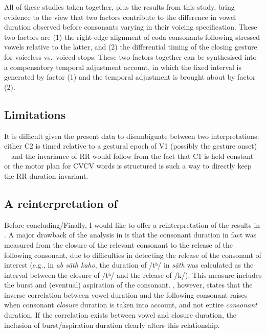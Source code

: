 \documentclass[]{JASAnew}
\begin{document}
All of these studies taken together, plus the results from this study,
bring evidence to the view that two factors contribute to the difference
in vowel duration observed before consonants varying in their voicing
specification. These two factors are (1) the right-edge alignment of
coda consonants following stressed vowels relative to the latter, and
(2) the differential timing of the closing gesture for voiceless
vs.~voiced stops. These two factors together can be synthesised into a
compensatory temporal adjustment account, in which the fixed interval is
generated by factor (1) and the temporal adjustment is brought about by
factor (2).

\hypertarget{limitations}{%
\subsection{Limitations}\label{limitations}}

It is difficult given the present data to disambiguate between two
interpretations: either C2 is timed relative to a gestural epoch of V1
(possibly the gesture onset)---and the invariance of RR would follow
from the fact that C1 is held constant--- or the motor plan for CVCV
words is structured is such a way to directly keep the RR duration
invariant.

\hypertarget{a-reinterpretation-of-maddieson1976}{%
\subsection{\texorpdfstring{A reinterpretation of
\citet{maddieson1976}}{A reinterpretation of @maddieson1976}}\label{a-reinterpretation-of-maddieson1976}}

Before concluding/Finally, I would like to offer a reinterpretation of
the results in \citet{maddieson1976}. A major drawback of the analysis
in \citet{maddieson1976} is that the consonant duration in fact was
measured from the closure of the relevant consonant to the release of
the following consonant, due to difficulties in detecting the release of
the consonant of interest (e.g., in \emph{ab sāth kaho}, the duration of
/tʰ/ in \emph{sāth} was calculated as the interval between the closure
of /tʰ/ and the release of /k/). This measure includes the burst and
(eventual) aspiration of the consonant. \citet{slis1969a}, however,
states that the inverse correlation between vowel duration and the
following consonant raises when consonant \emph{closure} duration is
taken into account, and not entire \emph{consonant} duration. If the
correlation exists between vowel and closure duration, the inclusion of
burst/aspiration duration clearly alters this relationship.
\end{document}
